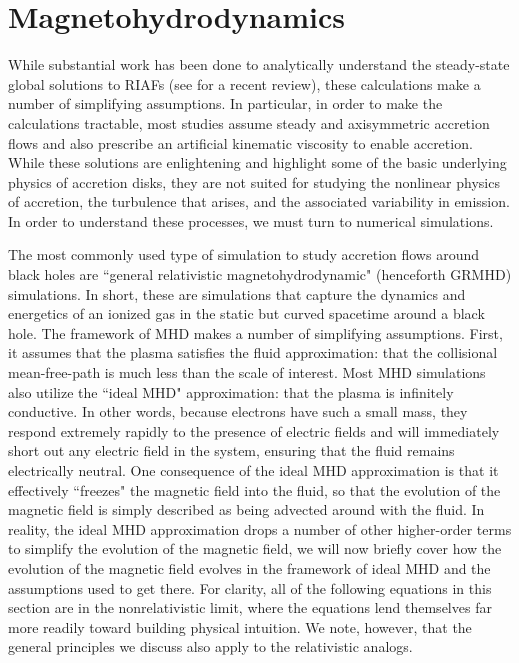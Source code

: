 \label{sec_lowlum}
\section{Magnetohydrodynamics}
While substantial work has been done to analytically understand the steady-state global solutions to RIAFs (see \citealt{yuan2014} for a recent review), these calculations make a number of simplifying assumptions.  In particular, in order to make the calculations tractable, most studies assume steady and axisymmetric accretion flows and also prescribe an artificial kinematic viscosity to enable accretion.  While these solutions are enlightening and highlight some of the basic underlying physics of accretion disks, they are not suited for studying the nonlinear physics of accretion, the turbulence that arises, and the associated variability in emission.  In order to understand these processes, we must turn to numerical simulations.

The most commonly used type of simulation to study accretion flows around black holes are ``general relativistic magnetohydrodynamic" (henceforth GRMHD) simulations.  In short, these are simulations that capture the dynamics and energetics of an ionized gas in the static but curved spacetime around a black hole.  The framework of MHD makes a number of simplifying assumptions.  First, it assumes that the plasma satisfies the fluid approximation: that the collisional mean-free-path is much less than the scale of interest.  Most MHD simulations also utilize the ``ideal MHD" approximation: that the plasma is infinitely conductive.  In other words, because electrons have such a small mass, they respond extremely rapidly to the presence of electric fields and will immediately short out any electric field in the system, ensuring that the fluid remains electrically neutral.  One consequence of the ideal MHD approximation is that it effectively ``freezes" the magnetic field into the fluid, so that the evolution of the magnetic field is simply described as being advected around with the fluid.  In reality, the ideal MHD approximation drops a number of other higher-order terms to simplify the evolution of the magnetic field, we will now briefly cover how the evolution of the magnetic field evolves in the framework of ideal MHD and the assumptions used to get there.  For clarity, all of the following equations in this section are in the nonrelativistic limit, where the equations lend themselves far more readily toward building physical intuition.  We note, however, that the general principles we discuss also apply to the relativistic analogs.

